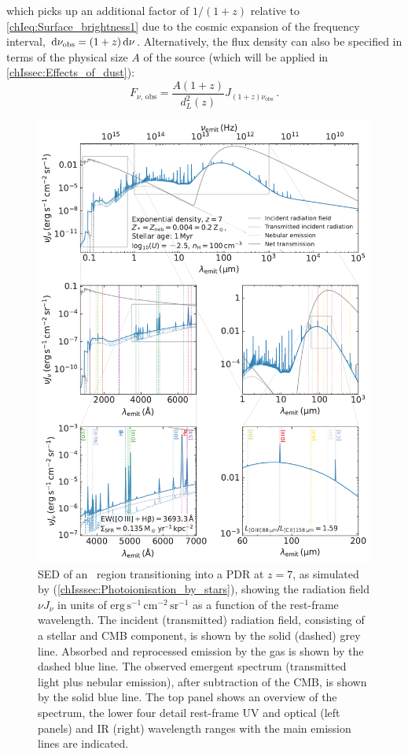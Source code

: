 \noindent which picks up an additional factor of $1/(1+z)$ relative to \cref{chIeq:Surface_brightness1} due to the cosmic expansion of the frequency interval, $\dif \nu_\text{obs} = (1+z) \dif \nu$. Alternatively, the flux density can also be specified in terms of the physical size $A$ of the source (which will be applied in \cref{chIssec:Effects_of_dust}):
\begin{equation}
    \label{chIeq:Flux_density2}
    F_{\nu, \, \text{obs}} = \frac{A \left( 1 + z \right)}{d_L^2(z)} J_{(1 + z) \nu_\text{obs}} \, .
\end{equation}
\begin{figure}
    \centering
    \includegraphics[width=0.9\linewidth]{"Figs/Cloudy_spectra"}
    \caption[SED of an \HII\ region transitioning into a PDR.]{SED of an \HII\ region transitioning into a PDR at $z = 7$, as simulated by  (\cref{chIsssec:Photoionisation_by_stars}), showing the radiation field $\nu J_\nu$ in units of $\mathrm{erg \, s^{-1} \, cm^{-2} \, sr^{-1}}$ as a function of the rest-frame wavelength. The incident (transmitted) radiation field, consisting of a stellar and CMB component, is shown by the solid (dashed) grey line. Absorbed and reprocessed emission by the gas is shown by the dashed blue line. The observed emergent spectrum (transmitted light plus nebular emission), after subtraction of the CMB, is shown by the solid blue line. The top panel shows an overview of the spectrum, the lower four detail rest-frame UV and optical (left panels) and IR (right) wavelength ranges with the main emission lines are indicated.}
    \label{chIfig:Cloudy_spectra}
\end{figure}

